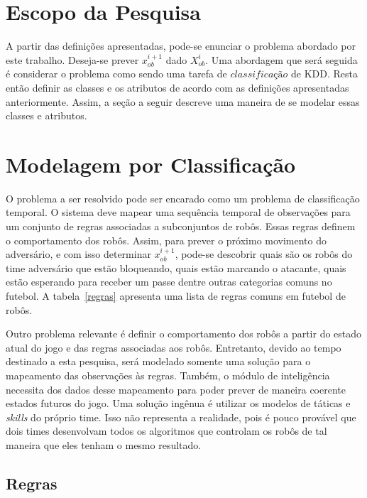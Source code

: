 \section{Escopo da Pesquisa}

A partir das definições apresentadas, pode-se enunciar o problema 
abordado por este trabalho. Deseja-se prever $x_{ob}^{i+1}$ dado
$X_{ob}^{i}$. Uma abordagem que será seguida é considerar
o problema como sendo uma tarefa de $classificação$ de KDD\@.
Resta então definir as classes e os atributos de acordo com as definições
apresentadas anteriormente. Assim, a seção a seguir descreve uma maneira
de se modelar essas classes e atributos.

\section{Modelagem por Classificação}

O problema a ser resolvido pode ser
encarado como um problema de classificação temporal. O sistema deve mapear uma
sequência temporal de observações para um conjunto de regras associadas a
subconjuntos de robôs. Essas regras definem o comportamento dos robôs. Assim,
para prever o próximo movimento do adversário, e com isso determinar
$x_{ob}^{i+1}$, pode-se descobrir quais são os robôs do time adversário que
estão bloqueando, quais estão marcando o atacante, quais estão esperando para
receber um passe dentre outras categorias comuns no futebol. A
tabela~\ref{regras} apresenta uma lista de regras comuns em futebol de robôs.

Outro problema relevante é definir o comportamento dos robôs a partir do estado
atual do jogo e das regras associadas aos robôs. Entretanto, devido ao tempo
destinado a esta pesquisa, será modelado somente uma solução para o mapeamento das
observações às regras. Também, o módulo de inteligência necessita dos dados
desse mapeamento para poder prever de maneira coerente estados futuros do jogo. Uma
solução ingênua é utilizar os modelos de táticas e \textit{skills} do próprio time.
Isso não representa a realidade, pois é pouco provável que dois times desenvolvam
todos os algoritmos que controlam os robôs de tal maneira que eles tenham o mesmo
resultado.

\subsection{Regras}


